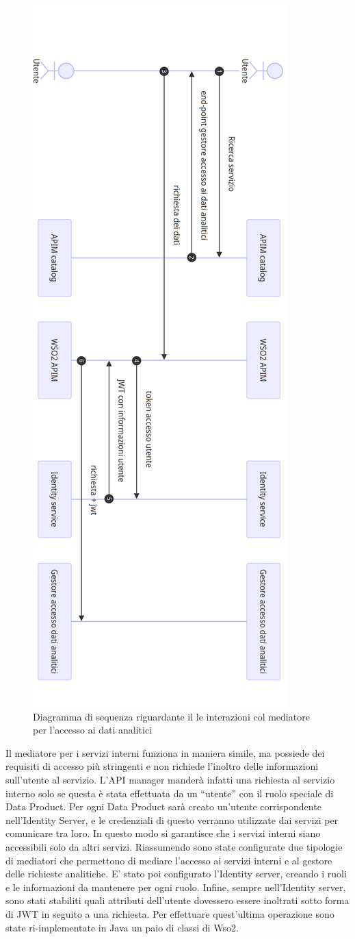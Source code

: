 \documentclass[12pt]{report}
\begin{document}
\begin{figure}[H]
    \centering
    \includegraphics[width = 0.5\linewidth]{immagini/Funzionamento mediatore dati analitci.png}
    \caption{Diagramma di sequenza riguardante il le interazioni col mediatore per l'accesso ai dati analitici}
    \label{funzionamento mediatore}
\end{figure}
Il mediatore per i servizi interni funziona in maniera simile, ma possiede dei requisiti di accesso più stringenti e non richiede l'inoltro delle informazioni sull'utente al servizio.
L'API manager manderà infatti una richiesta al servizio interno solo se questa è stata effettuata da un ``utente'' con il ruolo speciale di Data Product.
Per ogni Data Product sarà creato un'utente corrispondente nell'Identity Server, e le credenziali di questo verranno utilizzate dai servizi per comunicare tra loro.
In questo modo si garantisce che i servizi interni siano accessibili solo da altri servizi.
Riassumendo sono state configurate due tipologie di mediatori che permettono di mediare l'accesso ai servizi interni e al gestore delle richieste analitiche.
E' stato poi configurato l'Identity server, creando i ruoli e le informazioni da mantenere per ogni ruolo.
Infine, sempre nell'Identity server, sono stati stabiliti quali attributi dell'utente dovessero essere inoltrati sotto forma di JWT in seguito a una richiesta.
Per effettuare quest'ultima operazione sono state ri-implementate in Java un paio di classi di Wso2.
\end{document}
